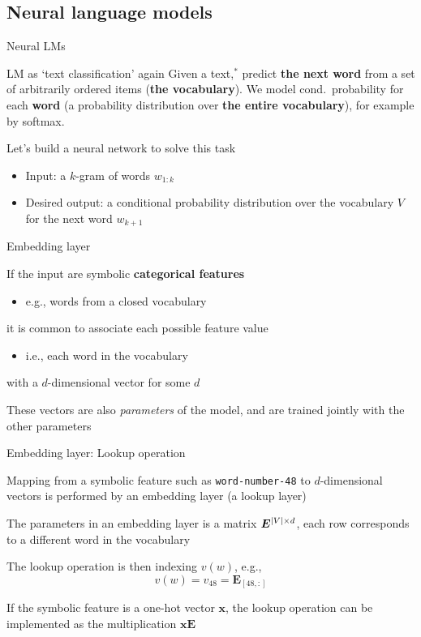\documentclass[12pt,aspectratio=169,handout]{beamer}
\begin{document}
\subsection{Neural language models}

\begin{frame}{Neural LMs}

\begin{block}{LM as `text classification' again}
Given a text,$^*$ predict \textbf{the next word} from a set of arbitrarily ordered items (\textbf{the vocabulary}).
We model cond.\ probability for each \textbf{word} (a probability distribution over \textbf{the entire vocabulary}), for example by softmax.
\end{block}
	
Let's build a neural network to solve this task
\pause
	\begin{itemize}
		\item Input: a $k$-gram of words $w_{1:k}$
		\item Desired output: a conditional probability distribution over the vocabulary $V$ for the next word $w_{k+1}$
	\end{itemize}
	
\end{frame}

\begin{frame}{Embedding layer}
	
	If the input are symbolic \textbf{categorical features}
	\begin{itemize}
		\item e.g., words from a closed vocabulary
	\end{itemize}
	it is common to associate each possible feature value
	\begin{itemize}
		\item i.e., each word in the vocabulary
	\end{itemize}
	with a $d$-dimensional vector for some $d$
	
	\bigskip
	
	These vectors are also \emph{parameters} of the model, and are trained jointly with the other parameters
	
\end{frame}

\begin{frame}{Embedding layer: Lookup operation}
	
	Mapping from a symbolic feature such as \texttt{word-number-48} to $d$-dimensional vectors is performed by an embedding layer (a lookup layer)
	
	The parameters in an embedding layer is a matrix $\bm{E}^{\abs{V} \times d}$, each row corresponds to a different word in the vocabulary
	
	The lookup operation is then indexing $v(w)$, e.g.,
	$$v(w) = v_{48} = \bm{E}_{[48,:]}$$
	
	If the symbolic feature is a one-hot vector $\bm{x}$, the lookup operation can be implemented as the multiplication $\bm{x} \bm{E}$
	
\end{frame}
\end{document}
